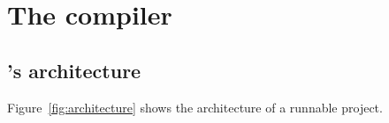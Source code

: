 \newcommand{\caret}{{\large\textbf{\textasciicircum}}}

\section{The \vonda compiler}

%
%
%
%

\subsection{\vonda's architecture}

Figure~\ref{fig:architecture} shows the architecture of a runnable \vonda project.


